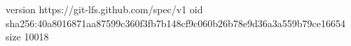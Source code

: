 version https://git-lfs.github.com/spec/v1
oid sha256:40a8016871aa87599c360f3fb7b148cf9c060b26b78e9d36a3a559b79ce16654
size 10018
